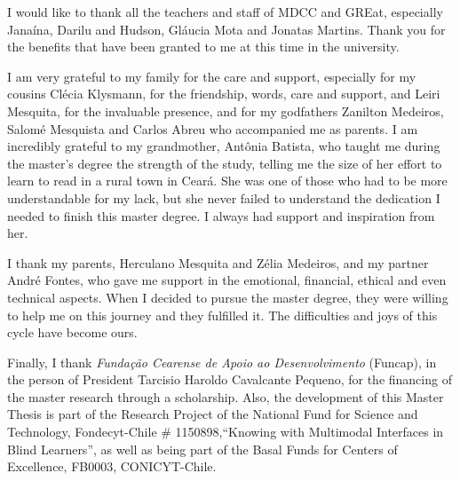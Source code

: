 I would like to thank all the teachers and staff of MDCC and GREat, especially Janaína, Darilu and Hudson, Gláucia Mota and Jonatas Martins. Thank you for the benefits that have been granted to me at this time in the university.

I am very grateful to my family for the care and support, especially for my cousins Clécia Klysmann, for the friendship, words, care and support, and  Leiri Mesquita, for the invaluable presence, and for my godfathers Zanilton Medeiros, Salomé Mesquista and Carlos Abreu who accompanied me as parents. I am incredibly grateful to my grandmother, Antônia Batista, who taught me during the master's degree the strength of the study, telling me the size of her effort to learn to read in a rural town in Ceará. She was one of those who had to be more understandable for my lack, but she never failed to understand the dedication I needed to finish this master degree. I always had support and inspiration from her.

I thank my parents, Herculano Mesquita and Zélia Medeiros, and my partner André Fontes, who gave me support in the emotional, financial, ethical and even technical aspects. When I decided to pursue the master degree, they were willing to help me on this journey and they fulfilled it. The difficulties and joys of this cycle have become ours.

Finally, I thank \textit{Fundação Cearense de Apoio ao Desenvolvimento} (Funcap), in the person of President Tarcisio Haroldo Cavalcante Pequeno, for the financing of the master research through a scholarship. Also, the development of this Master Thesis is part of the Research Project of the National Fund for Science and Technology, Fondecyt-Chile \# 1150898,``Knowing with Multimodal Interfaces in Blind Learners'', as well as being part of the Basal Funds for Centers of Excellence, FB0003, CONICYT-Chile.



